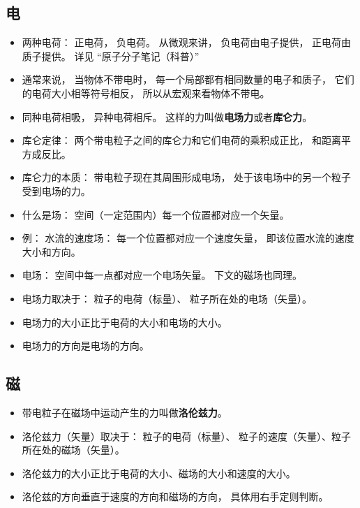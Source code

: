 
\begin{issues}
\issueDraft
\end{issues}

\subsection{电}
\begin{itemize}
\item 两种电荷： 正电荷， 负电荷。 从微观来讲， 负电荷由电子提供， 正电荷由质子提供。 详见 “原子分子笔记（科普）”
\item 通常来说， 当物体不带电时， 每一个局部都有相同数量的电子和质子， 它们的电荷大小相等符号相反， 所以从宏观来看物体不带电。
\item 同种电荷相吸， 异种电荷相斥。 这样的力叫做\textbf{电场力}或者\textbf{库仑力}。
\item 库仑定律： 两个带电粒子之间的库仑力和它们电荷的乘积成正比， 和距离平方成反比。
\item 库仑力的本质： 带电粒子现在其周围形成电场， 处于该电场中的另一个粒子受到电场的力。
\item 什么是场： 空间（一定范围内）每一个位置都对应一个矢量。
\item 例： 水流的速度场： 每一个位置都对应一个速度矢量， 即该位置水流的速度大小和方向。
\item 电场： 空间中每一点都对应一个电场矢量。 下文的磁场也同理。
\item 电场力取决于：  粒子的电荷（标量）、 粒子所在处的电场（矢量）。
\item 电场力的大小正比于电荷的大小和电场的大小。
\item 电场力的方向是电场的方向。
\end{itemize}

\subsection{磁}
\begin{itemize}
\item 带电粒子在磁场中运动产生的力叫做\textbf{洛伦兹力}。
\item 洛伦兹力（矢量）取决于： 粒子的电荷（标量）、 粒子的速度（矢量）、粒子所在处的磁场（矢量）。
\item 洛伦兹力的大小正比于电荷的大小、磁场的大小和速度的大小。
\item 洛伦兹的方向垂直于速度的方向和磁场的方向， 具体用右手定则判断。
\end{itemize}
